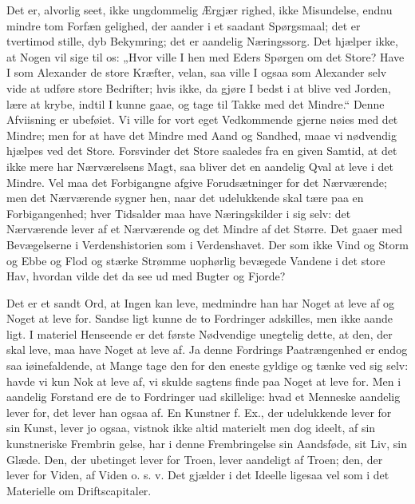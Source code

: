 \documentclass[12pt]{book}
\newcommand{\opage}[1]{\marginnote{\footnotesize\textit{[#1]}}}
\begin{document}
Det er, alvorlig seet, ikke ungdommelig Ærgjær\-%
righed, ikke Misundelse, endnu mindre tom Forfæn\-%
gelighed, der aander i et saadant Spørgsmaal; det er
tvertimod stille, dyb Bekymring; det er aandelig
Næringssorg. Det hjælper ikke, at Nogen vil sige til
os: „Hvor ville I hen med Eders Spørgen om det Store?
Have I som Alexander de store Kræfter, velan, saa
ville I ogsaa som Alexander selv vide at udføre store
Bedrifter; hvis ikke, da gjøre I bedst i at blive ved
Jorden, lære at krybe, indtil I kunne gaae, og tage til
Takke med det Mindre.“ Denne Afviisning er ubeføiet.
Vi ville for vort eget Vedkommende gjerne nøies med
det Mindre; men for at have det Mindre med Aand og
Sandhed, maae vi nødvendig hjælpes ved det Store.
Forsvinder det Store saaledes fra en given Samtid, at
det ikke mere har Nærværelsens Magt, saa bliver det
en aandelig Qval at leve i det Mindre. Vel maa det
Forbigangne afgive Forudsætninger for det Nærværende;
men det Nærværende sygner hen, naar det udelukkende skal
tære paa en Forbigangenhed; hver Tidsalder maa have
Næringskilder i sig selv: det Nærværende lever af et
Nærværende og det Mindre af det Større. Det gaaer med
Bevægelserne i Verdenshistorien som i Verdenshavet. Der\-%
som ikke Vind og Storm og Ebbe og Flod og stærke
Strømme uophørlig bevægede Vandene i det store Hav,
hvordan vilde det da see ud med Bugter og Fjorde?

Det er et sandt Ord, at Ingen kan leve, medmindre
han har Noget at leve af og Noget at leve for. Sandse\-%
ligt kunne de to Fordringer adskilles, men ikke aande\-%
ligt. I materiel Henseende er det første Nødvendige
unegtelig dette, at den, der skal leve, maa have Noget
\opage{19}\setcounter{footnote}{0}%
at leve af. Ja denne Fordrings Paatrængenhed er endog
saa iøinefaldende, at Mange tage den for den eneste
gyldige og tænke ved sig selv: havde vi kun Nok at
leve af, vi skulde sagtens finde paa Noget at leve for.
Men i aandelig Forstand ere de to Fordringer uad\-%
skillelige: hvad et Menneske aandelig lever for, det lever
han ogsaa af. En Kunstner f. Ex., der udelukkende
lever for sin Kunst, lever jo ogsaa, vistnok ikke altid
materielt men dog ideelt, af sin kunstneriske Frembrin\-%
gelse, har i denne Frembringelse sin Aandsføde, sit Liv,
sin Glæde. Den, der ubetinget lever for Troen, lever
aandeligt af Troen; den, der lever for Viden, af Viden
o. s. v. Det gjælder i det Ideelle ligesaa vel som i det
Materielle om Driftscapitaler.
\end{document}
